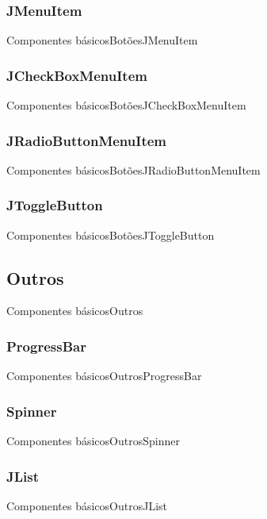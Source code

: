 \documentclass[10pt]{beamer}
\begin{document}
\subsubsection{JMenuItem}
\begin{frame}{Componentes básicos}{Botões}{JMenuItem}
\end{frame}{}
\subsubsection{JCheckBoxMenuItem}
\begin{frame}{Componentes básicos}{Botões}{JCheckBoxMenuItem}
\end{frame}{}
\subsubsection{JRadioButtonMenuItem}
\begin{frame}{Componentes básicos}{Botões}{JRadioButtonMenuItem}
\end{frame}{}
\subsubsection{JToggleButton}
\begin{frame}{Componentes básicos}{Botões}{JToggleButton}
\end{frame}{}
\subsection{Outros}
\begin{frame}{Componentes básicos}{Outros}
\end{frame}{}
\subsubsection{ProgressBar}
\begin{frame}{Componentes básicos}{Outros}{ProgressBar}
\end{frame}{}
\subsubsection{Spinner}
\begin{frame}{Componentes básicos}{Outros}{Spinner}
\end{frame}{}
\subsubsection{JList}
\begin{frame}{Componentes básicos}{Outros}{JList}
\end{frame}{}
\end{document}
